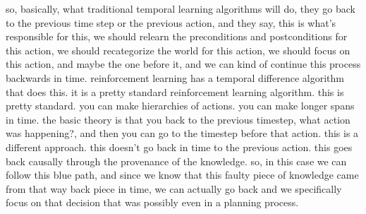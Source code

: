 so, basically, what traditional temporal learning algorithms will do, they go back to the previous time step or the previous action, and they say, this is what's responsible for this, we should relearn the preconditions and postconditions for this action, we should recategorize the world for this action, we should focus on this action, and maybe the one before it, and we can kind of continue this process backwards in time.
reinforcement learning has a temporal difference algorithm that does this.
it is a pretty standard reinforcement learning algorithm.
this is pretty standard.
you can make hierarchies of actions.
you can make longer spans in time.
the basic theory is that you back to the previous timestep, what action was happening?, and then you can go to the timestep before that action.
this is a different approach.
this doesn't go back in time to the previous action.
this goes back causally through the provenance of the knowledge.
so, in this case we can follow this blue path, and since we know that this faulty piece of knowledge came from that way back piece in time, we can actually go back and we specifically focus on that decision that was possibly even in a planning process.



